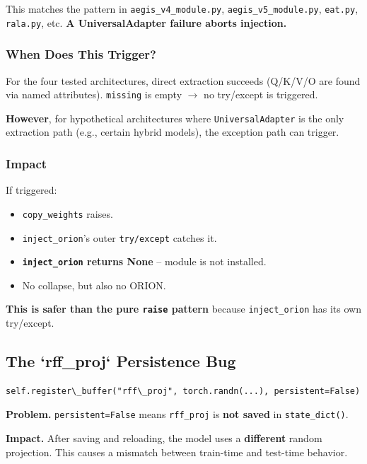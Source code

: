 This matches the pattern in \texttt{aegis\_v4\_module.py}, \texttt{aegis\_v5\_module.py}, 
\texttt{eat.py}, \texttt{rala.py}, etc. \textbf{A UniversalAdapter failure aborts injection.}

\subsubsection{When Does This Trigger?}

For the four tested architectures, direct extraction succeeds (Q/K/V/O 
are found via named attributes). \texttt{missing} is empty $\to$ no try/except is 
triggered.

\textbf{However}, for hypothetical architectures where \texttt{UniversalAdapter} is 
the only extraction path (e.g., certain hybrid models), the exception 
path can trigger.

\subsubsection{Impact}

If triggered:
\begin{itemize}
\item \texttt{copy\_weights} raises.
\item \texttt{inject\_orion}'s outer \texttt{try/except} catches it.
\item \textbf{\texttt{inject\_orion} returns None} -- module is not installed.
\item No collapse, but also no ORION.

\end{itemize}
\textbf{This is safer than the pure \texttt{raise} pattern} because \texttt{inject\_orion} 
has its own try/except.

\subsection{The `rff\_proj` Persistence Bug}

\begin{lstlisting}
self.register\_buffer("rff\_proj", torch.randn(...), persistent=False)
\end{lstlisting}

\textbf{Problem.} \texttt{persistent=False} means \texttt{rff\_proj} is \textbf{not saved} in 
\texttt{state\_dict()}.

\textbf{Impact.} After saving and reloading, the model uses a \textbf{different} 
random projection. This causes a mismatch between train-time and test-time 
behavior.

